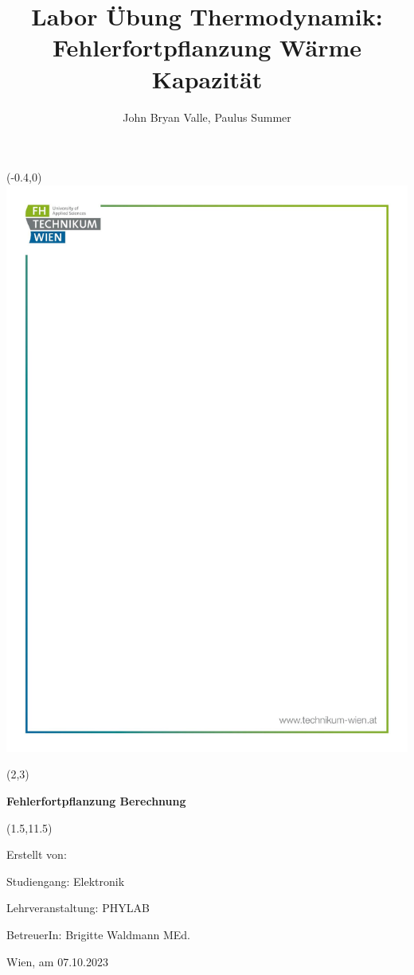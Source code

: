 \documentclass[10pt,a4paper]{article}
\title{Labor Übung Thermodynamik: Fehlerfortpflanzung Wärme Kapazität}
\author{John Bryan Valle, Paulus Summer}
\newcommand{\thema}{Fehlerfortpflanzung Berechnung}
\newcommand{\studiengang}{Elektronik}
\newcommand{\lehrveranstaltung}{PHYLAB}
\newcommand{\betreuerin}{Brigitte Waldmann MEd.}
\newcommand{\erstellungsdatum}{07.10.2023}
\begin{document}
\begin{titlepage}

\begin{textblock}{3}(-0.4,0)
\includegraphics{bilder/Deckblatt.pdf}
\end{textblock}
\mbox{}

\begin{textblock}{8}(2,3)

\noindent \Huge \textbf{\thema}

\noindent \Huge  \thetitle
\end{textblock}

\begin{textblock}{12.5}(1.5,11.5)

\Large Erstellt von: \hfill \theauthor

\Large Studiengang: \hfill \studiengang

\Large Lehrveranstaltung: \hfill \lehrveranstaltung

\Large BetreuerIn: \hfill \betreuerin

\Large Wien, am \erstellungsdatum 
\end{textblock}
\end{titlepage}
\end{document}
